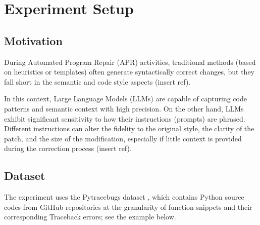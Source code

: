 \section{Experiment Setup}
\subsection{Motivation}

During Automated Program Repair (APR) activities, traditional methods (based on heuristics or templates) often generate syntactically correct changes, but they fall short in the semantic and code style aspects (insert ref).

In this context, Large Language Models (LLMs) are capable of capturing code patterns and semantic context with high precision.
On the other hand, LLMs exhibit significant sensitivity to how their instructions (prompts) are phrased. Different instructions can alter the fidelity to the original style, the clarity of the patch, and the size of the modification, especially if little context is provided during the correction process (insert ref).

\subsection{Dataset}
The experiment uses the Pytracebugs dataset \cite{Pytracebugs}, which contains Python source codes from GitHub repositories at the granularity of function snippets and their corresponding Traceback errors; see the example below.

